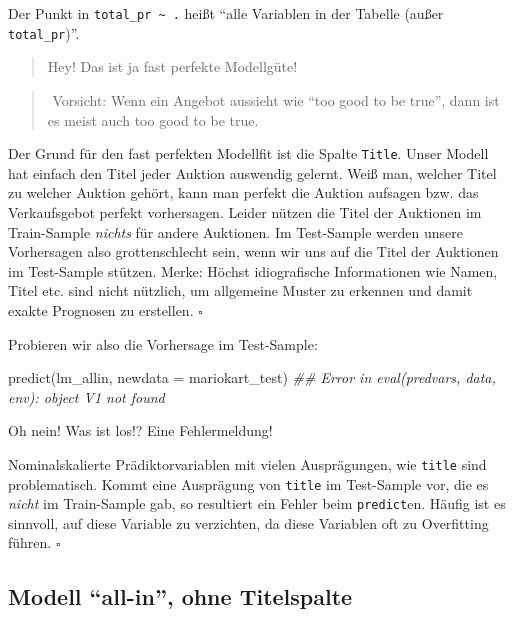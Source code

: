 \documentclass[
  letterpaper,
  oneside,
  open=any]{scrbook}
\newenvironment{Shaded}{\begin{snugshade}}{\end{snugshade}}
\newcommand{\AttributeTok}[1]{\textcolor[rgb]{0.40,0.45,0.13}{#1}}
\newcommand{\DocumentationTok}[1]{\textcolor[rgb]{0.37,0.37,0.37}{\textit{#1}}}
\newcommand{\FunctionTok}[1]{\textcolor[rgb]{0.28,0.35,0.67}{#1}}
\newcommand{\NormalTok}[1]{\textcolor[rgb]{0.00,0.23,0.31}{#1}}
\theoremstyle{definition}
\theoremstyle{definition}
\theoremstyle{definition}
\theoremstyle{remark}
\begin{document}
Der Punkt in \texttt{total\_pr\ \textasciitilde{}\ .} heißt
\enquote{alle Variablen in der Tabelle (außer \texttt{total\_pr})}.

\begin{quote}
{} Hey! Das ist ja fast perfekte Modellgüte!
\end{quote}

\begin{quote}
{}️ Vorsicht: Wenn ein Angebot aussieht wie
\enquote{too good to be true}, dann ist es meist auch too good to be
true.
\end{quote}

Der Grund für den fast perfekten Modellfit ist die Spalte
\texttt{Title}. Unser Modell hat einfach den Titel jeder Auktion
auswendig gelernt. Weiß man, welcher Titel zu welcher Auktion gehört,
kann man perfekt die Auktion aufsagen bzw. das Verkaufsgebot perfekt
vorhersagen. Leider nützen die Titel der Auktionen im Train-Sample
\emph{nichts} für andere Auktionen. Im Test-Sample werden unsere
Vorhersagen also grottenschlecht sein, wenn wir uns auf die Titel der
Auktionen im Test-Sample stützen. Merke: Höchst idiografische
Informationen wie Namen, Titel etc. sind nicht nützlich, um allgemeine
Muster zu erkennen und damit exakte Prognosen zu erstellen. \(\square\)

Probieren wir also die Vorhersage im Test-Sample:

\begin{Shaded}
\begin{Highlighting}[]
\FunctionTok{predict}\NormalTok{(lm\_allin, }\AttributeTok{newdata =}\NormalTok{ mariokart\_test)}
\DocumentationTok{\#\# Error in eval(predvars, data, env): object \textquotesingle{}V1\textquotesingle{} not found}
\end{Highlighting}
\end{Shaded}

Oh nein! Was ist los!? Eine Fehlermeldung!

Nominalskalierte Prädiktorvariablen mit vielen Ausprägungen, wie
\texttt{title} sind problematisch. Kommt eine Ausprägung von
\texttt{title} im Test-Sample vor, die es \emph{nicht} im Train-Sample
gab, so resultiert ein Fehler beim \texttt{predict}en. Häufig ist es
sinnvoll, auf diese Variable zu verzichten, da diese Variablen oft zu
Overfitting führen. \(\square\)

\subsection{\texorpdfstring{Modell \enquote{all-in}, ohne
Titelspalte}{Modell ``all-in'', ohne Titelspalte}}\label{modell-all-in-ohne-titelspalte}
\end{document}
